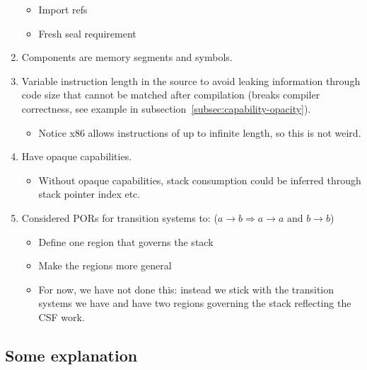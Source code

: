 \documentclass[a4paper]{article}
\begin{document}
\begin{enumerate}
\begin{itemize}
  \item Import refs
  \item Fresh seal requirement
  \end{itemize}
\item Components are memory segments and symbols.
\item Variable instruction length in the source to avoid leaking information through code size that cannot be matched after compilation (breaks compiler correctness, see example in subsection~\ref{subsec:capability-opacity}).
  \begin{itemize}
  \item Notice x86 allows instructions of up to infinite length, so this is not weird.
  \end{itemize}
\item Have opaque capabilities.
  \begin{itemize}
  \item Without opaque capabilities, stack consumption could be inferred through stack pointer index etc.
  \end{itemize}
\item Considered PORs for transition systems to: ($a \rightarrow b \Rightarrow a \rightarrow a \text{ and } b \rightarrow b$)
  \begin{itemize}
  \item Define one region that governs the stack
  \item Make the regions more general
  \item For now, we have not done this: instead we stick with the transition systems we have and have two regions governing the stack reflecting the CSF work.
  \end{itemize}
\end{enumerate}

\subsection{Some explanation}
\end{document}
